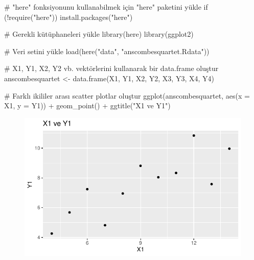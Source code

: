\documentclass[
  letterpaper,
  DIV=11,
  numbers=noendperiod]{scrartcl}
\newenvironment{Shaded}{\begin{snugshade}}{\end{snugshade}}
\newcommand{\AttributeTok}[1]{\textcolor[rgb]{0.40,0.45,0.13}{#1}}
\newcommand{\CommentTok}[1]{\textcolor[rgb]{0.37,0.37,0.37}{#1}}
\newcommand{\ControlFlowTok}[1]{\textcolor[rgb]{0.00,0.23,0.31}{#1}}
\newcommand{\FunctionTok}[1]{\textcolor[rgb]{0.28,0.35,0.67}{#1}}
\newcommand{\NormalTok}[1]{\textcolor[rgb]{0.00,0.23,0.31}{#1}}
\newcommand{\OtherTok}[1]{\textcolor[rgb]{0.00,0.23,0.31}{#1}}
\newcommand{\SpecialCharTok}[1]{\textcolor[rgb]{0.37,0.37,0.37}{#1}}
\newcommand{\StringTok}[1]{\textcolor[rgb]{0.13,0.47,0.30}{#1}}
\begin{document}
\begin{Shaded}
\begin{Highlighting}[]
\CommentTok{\# "here" fonksiyonunu kullanabilmek için "here" paketini yükle}
\ControlFlowTok{if}\NormalTok{ (}\SpecialCharTok{!}\FunctionTok{require}\NormalTok{(}\StringTok{"here"}\NormalTok{)) }\FunctionTok{install.packages}\NormalTok{(}\StringTok{"here"}\NormalTok{)}

\CommentTok{\# Gerekli kütüphaneleri yükle}
\FunctionTok{library}\NormalTok{(here)}
\FunctionTok{library}\NormalTok{(ggplot2)}

\CommentTok{\# Veri setini yükle}
\FunctionTok{load}\NormalTok{(}\FunctionTok{here}\NormalTok{(}\StringTok{"data"}\NormalTok{, }\StringTok{"anscombesquartet.Rdata"}\NormalTok{))}

\CommentTok{\# X1, Y1, X2, Y2 vb. vektörlerini kullanarak bir data.frame oluştur}
\NormalTok{anscombesquartet }\OtherTok{\textless{}{-}} \FunctionTok{data.frame}\NormalTok{(X1, Y1, X2, Y2, X3, Y3, X4, Y4)}

\CommentTok{\# Farklı ikililer arası scatter plotlar oluştur}
\FunctionTok{ggplot}\NormalTok{(anscombesquartet, }\FunctionTok{aes}\NormalTok{(}\AttributeTok{x =}\NormalTok{ X1, }\AttributeTok{y =}\NormalTok{ Y1)) }\SpecialCharTok{+} 
  \FunctionTok{geom\_point}\NormalTok{() }\SpecialCharTok{+} 
  \FunctionTok{ggtitle}\NormalTok{(}\StringTok{"X1 ve Y1"}\NormalTok{)}
\end{Highlighting}
\end{Shaded}

\begin{figure}[H]

{\centering \includegraphics{4_hafta_tanimlayici_istatistik_files/figure-pdf/unnamed-chunk-26-1.pdf}

}

\end{figure}
\end{document}
